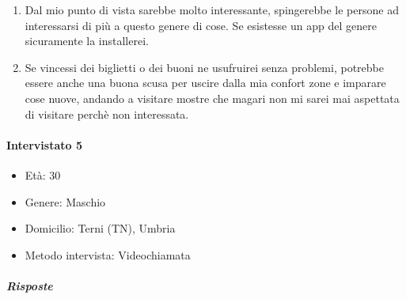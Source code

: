 \documentclass{article}
\begin{document}
\begin{enumerate}
\item Dal mio punto di vista sarebbe molto interessante, spingerebbe le persone ad interessarsi di più a questo genere di cose. Se esistesse un app del genere sicuramente la installerei.
\item Se vincessi dei biglietti o dei buoni ne usufruirei senza problemi, potrebbe essere anche una buona scusa per uscire dalla mia confort zone e imparare cose nuove, andando a visitare mostre che magari non mi sarei mai aspettata di visitare perchè non interessata.
\end{enumerate}

\paragraph{Intervistato 5}
\begin{itemize}
\item Età: 30
\item Genere: Maschio
\item Domicilio: Terni (TN), Umbria
\item Metodo intervista: Videochiamata
\end{itemize}
\subparagraph{Risposte}
\end{document}
